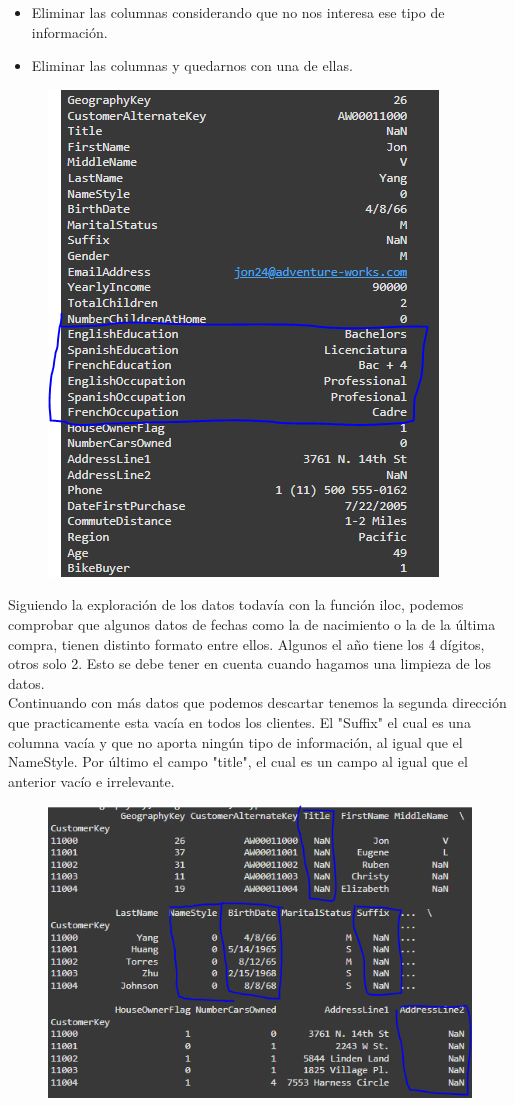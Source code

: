 \documentclass[12pt]{article}
\begin{document}
\begin{itemize}
    \item Eliminar las columnas considerando que no nos interesa ese tipo de información.
    \item Eliminar las columnas y quedarnos con una de ellas.
\end{itemize}

\begin{figure}[h!]
    \centering
    \includegraphics[width=.6\textwidth]{Exploracion1.PNG}
    \label{fig:my_label}
\end{figure}

Siguiendo la exploración de los datos todavía con la función iloc, podemos comprobar que algunos datos de fechas como la de
nacimiento o la de la última compra, tienen distinto formato entre ellos. Algunos el año tiene los 4 dígitos, otros solo 2.
Esto se debe tener en cuenta cuando hagamos una limpieza de los datos.
\\
Continuando con más datos que podemos descartar tenemos la segunda dirección que practicamente esta vacía en todos los clientes.
El "Suffix" el cual es una columna vacía y que no aporta ningún tipo de información, al igual que el NameStyle.
Por último el campo "title", el cual es un campo al igual que el anterior vacío e irrelevante.

\begin{figure}[h!]
    \centering
    \includegraphics[width=.6\textwidth]{Exploracion2.PNG}
    \label{fig:my_label}
\end{figure}
\end{document}
